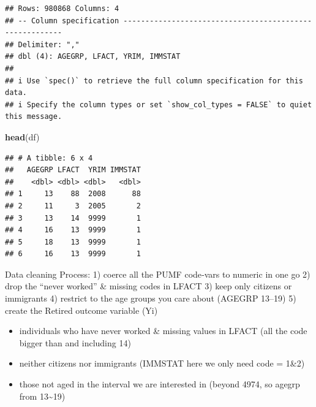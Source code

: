 \documentclass[
]{article}
\newenvironment{Shaded}{\begin{snugshade}}{\end{snugshade}}
\newcommand{\FunctionTok}[1]{\textcolor[rgb]{0.13,0.29,0.53}{\textbf{#1}}}
\newcommand{\NormalTok}[1]{#1}
\providecommand{\tightlist}{%
  \setlength{\itemsep}{0pt}\setlength{\parskip}{0pt}}
\begin{document}
\begin{verbatim}
## Rows: 980868 Columns: 4
## -- Column specification --------------------------------------------------------
## Delimiter: ","
## dbl (4): AGEGRP, LFACT, YRIM, IMMSTAT
## 
## i Use `spec()` to retrieve the full column specification for this data.
## i Specify the column types or set `show_col_types = FALSE` to quiet this message.
\end{verbatim}

\begin{Shaded}
\begin{Highlighting}[]
\FunctionTok{head}\NormalTok{(df)}
\end{Highlighting}
\end{Shaded}

\begin{verbatim}
## # A tibble: 6 x 4
##   AGEGRP LFACT  YRIM IMMSTAT
##    <dbl> <dbl> <dbl>   <dbl>
## 1     13    88  2008      88
## 2     11     3  2005       2
## 3     13    14  9999       1
## 4     16    13  9999       1
## 5     18    13  9999       1
## 6     16    13  9999       1
\end{verbatim}

Data cleaning Process: 1) coerce all the PUMF code‐vars to numeric in
one go 2) drop the ``never worked'' \& missing codes in LFACT 3) keep
only citizens or immigrants 4) restrict to the age groups you care about
(AGEGRP 13--19) 5) create the Retired outcome variable (Yi)

\begin{itemize}
\tightlist
\item
  individuals who have never worked \& missing values in LFACT (all the
  code bigger than and including 14)
\item
  neither citizens nor immigrants (IMMSTAT here we only need code =
  1\&2)
\item
  those not aged in the interval we are interested in (beyond 4974, so
  agegrp from 13\textasciitilde19)
\end{itemize}
\end{document}
